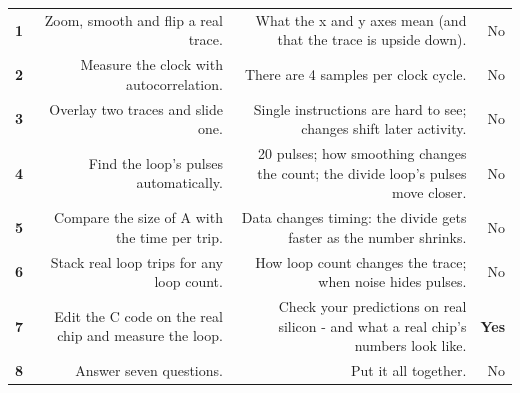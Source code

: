 \documentclass[11pt,letterpaper]{article}
\begin{document}
\begin{center}
\end{center}

\vspace{6pt}

{\small{}
\begin{longtable}{|R{0.0725}|R{0.3478}|R{0.4348}|R{0.1449}|}
\hline
{} &  &  &  \\ \hline
\endhead
\textbf{1} & Zoom, smooth and flip a real trace. & What the x and y axes mean (and that the trace is upside down). & No \\ \hline
\textbf{2} & Measure the clock with autocorrelation. & There are 4 samples per clock cycle. & No \\ \hline
\textbf{3} & Overlay two traces and slide one. & Single instructions are hard to see; changes shift later activity. & No \\ \hline
\textbf{4} & Find the loop's pulses automatically. & 20 pulses; how smoothing changes the count; the divide loop's pulses move closer. & No \\ \hline
\textbf{5} & Compare the size of A with the time per trip. & Data changes timing: the divide gets faster as the number shrinks. & No \\ \hline
\textbf{6} & Stack real loop trips for any loop count. & How loop count changes the trace; when noise hides pulses. & No \\ \hline
\textbf{7} & Edit the C code on the real chip and measure the loop. & Check your predictions on real silicon - and what a real chip's numbers look like. & \textbf{Yes} \\ \hline
\textbf{8} & Answer seven questions. & Put it all together. & No \\ \hline
\end{longtable}}
\end{document}

